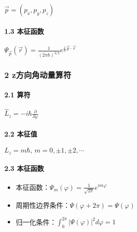 \documentclass[UTF8,twocolumn]{ctexart}
\providecommand{\tightlist}{%
  \setlength{\itemsep}{0pt}\setlength{\parskip}{0pt}}
\let\oldparagraph\paragraph
\renewcommand{\paragraph}[1]{\oldparagraph{#1}\mbox{}}
\begin{document}
\begin{center}
\(\vec{p}=(p_x,p_y,p_z)\)
\end{center}

\hypertarget{ux672cux5f81ux51fdux6570}{%
\paragraph{ 1.3 本征函数}\label{ux672cux5f81ux51fdux6570}}

\begin{center}
\(\Psi_{\vec{p}}(\vec{r})=\frac{1}{(2\pi\hbar)^{3/2}}e^{\frac{i}{\hbar}\vec{p}\cdot\vec{r}}\)
\end{center}

\hypertarget{zux65b9ux5411ux89d2ux52a8ux91cfux7b97ux7b26}{%
\subsubsection{2
z方向角动量算符}\label{zux65b9ux5411ux89d2ux52a8ux91cfux7b97ux7b26}}

\hypertarget{ux7b97ux7b26-1}{%
\paragraph{ 2.1 算符}\label{ux7b97ux7b26-1}}

\begin{center}
\(\hat{L}_z=-i\hbar\frac{\partial}{\partial\varphi}\)
\end{center}

\hypertarget{ux672cux5f81ux503c-2}{%
\paragraph{ 2.2 本征值}\label{ux672cux5f81ux503c-2}}

\begin{center}
\(L_z=m\hbar,\,m=0,\pm1,\pm2,\cdots\)
\end{center}

\hypertarget{ux672cux5f81ux51fdux6570-1}{%
\paragraph{ 2.3 本征函数}\label{ux672cux5f81ux51fdux6570-1}}

\begin{itemize}
\tightlist
\item
  本征函数：\(\Psi_m(\varphi)=\frac{1}{\sqrt{2\pi}}e^{im\varphi}\)
\item
  周期性边界条件：\(\Psi(\varphi+2\pi)=\Psi(\varphi)\)
\item
  归一化条件：\(\int_0^{2\pi}|\Psi(\varphi)|^2d\varphi=1\)
\end{itemize}
\end{document}
